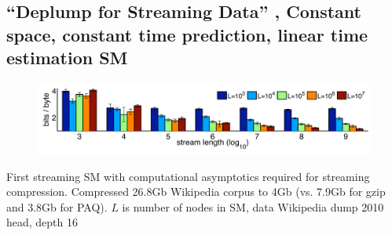 \documentclass[16pt]{beamer}
\begin{document}
\subsection{``Deplump for Streaming Data'' \citet{Bartlett2010}, Constant space, constant time prediction, linear time estimation SM}
\begin{frame}[t]{}
\begin{figure}[htbp]
\begin{center}
\includegraphics[width=\textwidth]{varying_stream_length.pdf}
\end{center}
\end{figure}
First streaming SM with computational asymptotics required for streaming compression.  Compressed 26.8Gb Wikipedia corpus to 4Gb (vs. 7.9Gb for gzip and 3.8Gb for PAQ).\newline
\vspace{3cm}
{\tiny $L$ is number of nodes in SM, data Wikipedia dump 2010 head, depth 16}
\end{frame}


\end{document}
